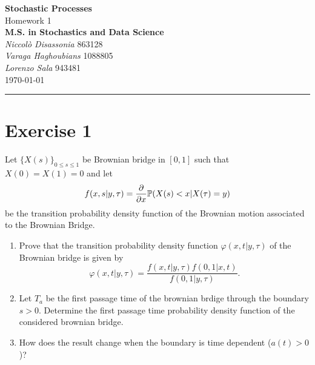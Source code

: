 \documentclass[12pt]{article}
\begin{document}
	\textcolor{UM_Brown}{
		\begin{center}
			\textbf{\Large Stochastic Processes}\\
			\vspace{5pt}
			Homework 1 \\
			\vspace{5pt}
			\textbf{M.S. in Stochastics and Data Science}\\
			\vspace{20pt}
			\textit{Niccolò Disassonia} 863128 \\
			\textit{Varaga Haghoubians} 1088805\\
			\textit{Lorenzo Sala} 943481\\
			\vspace{5pt}
			\today
		\end{center}
		\vspace{10pt}
		\hrule
	}
	
	
	
	
	\section*{Exercise 1}
	Let ${\{X(s)\}}_{0\leq s\leq 1}$ be Brownian bridge in $[0,1]$ such that $X(0)=X(1)=0$ and let 
	\begin{equation*}
		f(x,s|y,\tau)=\frac{\partial}{\partial x}\mathbb{P}(X(s)<x|X(\tau)=y)
	\end{equation*}
	be the transition probability density function of the Brownian motion associated to the Brownian Bridge.
	\begin{enumerate}
		\item Prove that the transition probability density function $\varphi(x,t|y,\tau)$ of the Brownian bridge is given by 
		\begin{equation*}
			\varphi(x,t|y,\tau)=\frac{f(x,t|y,\tau)f(0,1|x,t)}{f(0,1|y,\tau)}.
		\end{equation*}
		\item Let $T_a$ be the first passage time of the brownian brdige through the boundary $s>0$. Determine the first passage time probability density function of the considered brownian bridge.
		\item How does the result change when the boundary is time dependent ($a(t)>0$)?
	\end{enumerate}
\end{document}
